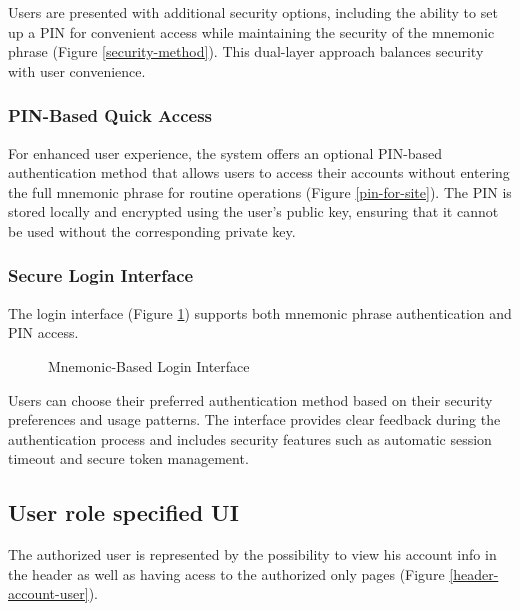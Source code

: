 Users are presented with additional security options, including the ability to set up a PIN for convenient access while maintaining the security of the mnemonic phrase (Figure \ref{security-method}). This dual-layer approach balances security with user convenience.

\subsubsection{PIN-Based Quick Access}
For enhanced user experience, the system offers an optional PIN-based authentication method that allows users to access their accounts without entering the full mnemonic phrase for routine operations (Figure \ref{pin-for-site}). The PIN is stored locally and encrypted using the user's public key, ensuring that it cannot be used without the corresponding private key.

\subsubsection{Secure Login Interface}
The login interface (Figure \ref{mnemonic-login}) supports both mnemonic phrase authentication and PIN access. 

\begin{figure}[H]
    \centering
    \caption{Mnemonic-Based Login Interface}
    \label{mnemonic-login}
\end{figure}

Users can choose their preferred authentication method based on their security preferences and usage patterns. The interface provides clear feedback during the authentication process and includes security features such as automatic session timeout and secure token management.

\subsection{User role specified UI}
The authorized user is represented by the possibility to view his account info in the header as well as having acess to the authorized only pages (Figure \ref{header-account-user}).

